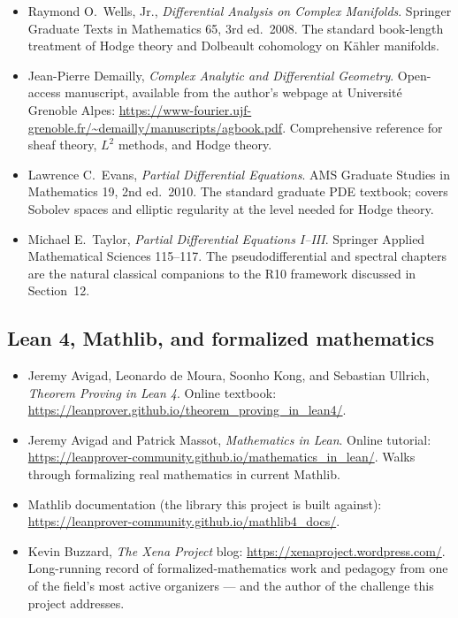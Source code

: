 \begin{itemize}
  \item Raymond O.\ Wells, Jr., \emph{Differential Analysis on
    Complex Manifolds}. Springer Graduate Texts in Mathematics 65,
    3rd ed.\ 2008. The standard book-length treatment of Hodge
    theory and Dolbeault cohomology on K\"ahler manifolds.
  \item Jean-Pierre Demailly, \emph{Complex Analytic and
    Differential Geometry}. Open-access manuscript, available from
    the author's webpage at Universit\'e Grenoble Alpes:
    \url{https://www-fourier.ujf-grenoble.fr/~demailly/manuscripts/agbook.pdf}.
    Comprehensive reference for sheaf theory, $L^2$ methods, and
    Hodge theory.
  \item Lawrence C.\ Evans, \emph{Partial Differential Equations}.
    AMS Graduate Studies in Mathematics 19, 2nd ed.\ 2010. The
    standard graduate PDE textbook; covers Sobolev spaces and
    elliptic regularity at the level needed for Hodge theory.
  \item Michael E.\ Taylor, \emph{Partial Differential Equations
    I--III}. Springer Applied Mathematical Sciences 115--117. The
    pseudodifferential and spectral chapters are the natural
    classical companions to the R10 framework discussed in
    Section~12.
\end{itemize}

\subsection*{Lean 4, Mathlib, and formalized mathematics}

\begin{itemize}
  \item Jeremy Avigad, Leonardo de Moura, Soonho Kong, and Sebastian
    Ullrich, \emph{Theorem Proving in Lean 4}. Online textbook:
    \url{https://leanprover.github.io/theorem_proving_in_lean4/}.
  \item Jeremy Avigad and Patrick Massot, \emph{Mathematics in
    Lean}. Online tutorial:
    \url{https://leanprover-community.github.io/mathematics_in_lean/}.
    Walks through formalizing real mathematics in current Mathlib.
  \item Mathlib documentation (the library this project is built
    against): \url{https://leanprover-community.github.io/mathlib4_docs/}.
  \item Kevin Buzzard, \emph{The Xena Project} blog:
    \url{https://xenaproject.wordpress.com/}. Long-running record of
    formalized-mathematics work and pedagogy from one of the
    field's most active organizers --- and the author of the
    challenge this project addresses.
\end{itemize}

